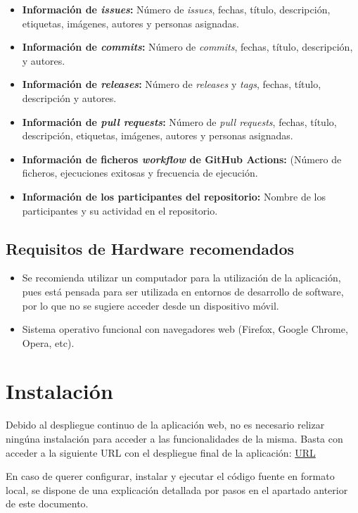 \begin{itemize}
    \item \textbf{Información de \textit{issues}:} Número de \textit{issues}, fechas, título, descripción, etiquetas, imágenes, autores y personas asignadas.
    \item \textbf{Información de \textit{commits}:} Número de \textit{commits}, fechas, título, descripción, y autores.
    \item \textbf{Información de \textit{releases}:} Número de \textit{releases} y  \textit{tags}, fechas, título, descripción y autores.
    \item \textbf{Información de \textit{pull requests}:} Número de \textit{pull requests}, fechas, título, descripción, etiquetas, imágenes, autores y personas asignadas.
    \item \textbf{Información de ficheros \textit{workflow} de GitHub Actions:} (Número de ficheros, ejecuciones exitosas y frecuencia de ejecución.
    \item \textbf{Información de los participantes del repositorio:} Nombre de los participantes y su actividad en el repositorio.
\end{itemize}

\subsection*{Requisitos de Hardware recomendados}
\begin{itemize}
	\item Se recomienda utilizar un computador para la utilización de la aplicación, pues está pensada para ser utilizada en entornos de desarrollo de software, por lo que no se sugiere acceder desde un dispositivo móvil.
	\item Sistema operativo funcional con navegadores web (Firefox, Google Chrome, Opera, etc).
\end{itemize}

\section{Instalación}

Debido al despliegue continuo de la aplicación web, no es necesario relizar ningúna instalación para acceder a las funcionalidades de la misma. Basta con acceder a la siguiente URL con el despliegue final de la aplicación: \url{URL}

En caso de querer configurar, instalar y ejecutar el código fuente en formato local, se dispone de una explicación detallada por pasos en el apartado anterior de este documento.

